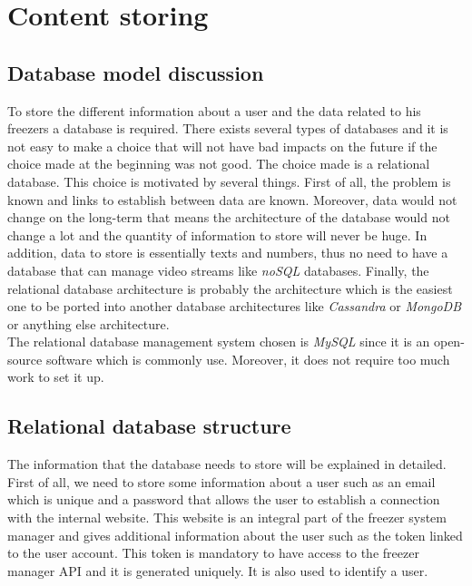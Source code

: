 \section{Content storing}
\subsection{Database model discussion}
To store the different information about a user and the data related to his freezers a database is required. There exists several types of databases and it is not easy to make a choice that will not have bad impacts on the future if the choice made at the beginning was not good. The choice made is a relational database. This choice is motivated by several things. First of all, the problem is known and links to establish between data are known. Moreover, data would not change on the long-term that means the architecture of the database would not change a lot and the quantity of information to store will never be huge. In addition, data to store is essentially texts and numbers, thus no need to have a database that can manage video streams like \textit{noSQL} databases. Finally, the relational database architecture is probably the architecture which is the easiest one to be ported into another database architectures like \textit{Cassandra} or \textit{MongoDB} or anything else architecture.\\

The relational database management system chosen is \textit{MySQL} since it is an open-source software which is commonly use. Moreover, it does not require too much work to set it up.

\subsection{Relational database structure}
The information that the database needs to store will be explained in detailed.\\

First of all, we need to store some information about a user such as an email which is unique and a password that allows the user to establish a connection with the internal website. This website is an integral part of the freezer system manager and gives additional information about the user such as the token linked to the user account. This token is mandatory to have access to the freezer manager API and it is generated uniquely. It is also used to identify a user. \\

